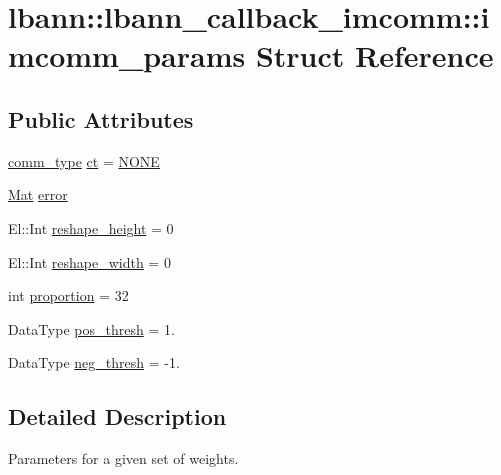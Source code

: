 \hypertarget{structlbann_1_1lbann__callback__imcomm_1_1imcomm__params}{}\section{lbann\+:\+:lbann\+\_\+callback\+\_\+imcomm\+:\+:imcomm\+\_\+params Struct Reference}
\label{structlbann_1_1lbann__callback__imcomm_1_1imcomm__params}
\subsection*{Public Attributes}
\begin{DoxyCompactItemize}
\item 
\hyperlink{classlbann_1_1lbann__callback__imcomm_acf7e894b3381e7f9b71020dc73594d6a}{comm\+\_\+type} \hyperlink{structlbann_1_1lbann__callback__imcomm_1_1imcomm__params_a11a805da5083e025171856111310d20d}{ct} = \hyperlink{classlbann_1_1lbann__callback__imcomm_acf7e894b3381e7f9b71020dc73594d6aafa59156bc4d5bcbf6bd80918d062da03}{N\+O\+NE}
\item 
\hyperlink{base_8hpp_a68f11fdc31b62516cb310831bbe54d73}{Mat} \hyperlink{structlbann_1_1lbann__callback__imcomm_1_1imcomm__params_ab62ef05ea8c9988e77e3a1943112c6b4}{error}
\item 
El\+::\+Int \hyperlink{structlbann_1_1lbann__callback__imcomm_1_1imcomm__params_a6e188e3683cb4d8cb562176417463cb5}{reshape\+\_\+height} = 0
\item 
El\+::\+Int \hyperlink{structlbann_1_1lbann__callback__imcomm_1_1imcomm__params_a3b2be3a390f473acdf1b9d72c5d240f0}{reshape\+\_\+width} = 0
\item 
int \hyperlink{structlbann_1_1lbann__callback__imcomm_1_1imcomm__params_a72725a9300a0c8e401497a1e2eef094f}{proportion} = 32
\item 
Data\+Type \hyperlink{structlbann_1_1lbann__callback__imcomm_1_1imcomm__params_a5b3b8285509cf1e5db630fd9616d07bc}{pos\+\_\+thresh} = 1.
\item 
Data\+Type \hyperlink{structlbann_1_1lbann__callback__imcomm_1_1imcomm__params_a9c8af36d86f1abe95e5f2c1c40d95e8c}{neg\+\_\+thresh} = -\/1.
\end{DoxyCompactItemize}


\subsection{Detailed Description}
Parameters for a given set of weights. 

